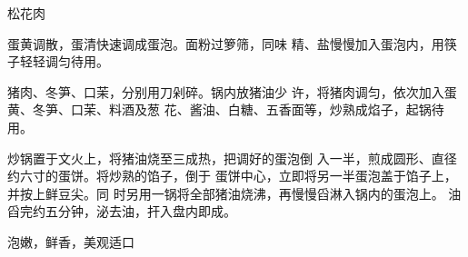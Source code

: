 \begin{recipe}{松花肉}

\ingredients


\cooking

\step 蛋黄调散，蛋清快速调成蛋泡。面粉过箩筛，同味 精、盐慢慢加入蛋泡内，用筷子轻轻调匀待用。

\step 猪肉、冬笋、口茉，分别用刀剁碎。锅内放猪油少 许，将猪肉调匀，依次加入蛋黄、冬笋、口茉、料酒及葱 花、酱油、白糖、五香面等，炒熟成焰子，起锅待用。

\step 炒锅置于文火上，将猪油烧至三成热，把调好的蛋泡倒 入一半，煎成圆形、直径约六寸的蛋饼。将炒熟的馅子，倒于 蛋饼中心，立即将另一半蛋泡盖于馅子上，并按上鲜豆尖。同 时另用一锅将全部猪油烧沸，再慢慢舀淋入锅内的蛋泡上。 油舀完约五分钟，泌去油，扞入盘内即成。

\notes

泡嫩，鲜香，美观适口

\end{recipe}

